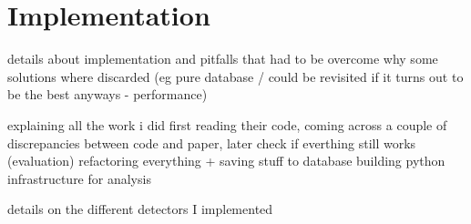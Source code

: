 \chapter{Implementation}
	details about implementation and pitfalls that had to be overcome
	why some solutions where discarded (eg pure database / could be revisited if it turns out to be the best anyways - performance)

explaining all the work i did
    first reading their code, coming across a couple of discrepancies between code and paper, later check if everthing still works (evaluation)
    refactoring everything + saving stuff to database
    building python infrastructure for analysis
    
details on the different detectors I implemented
